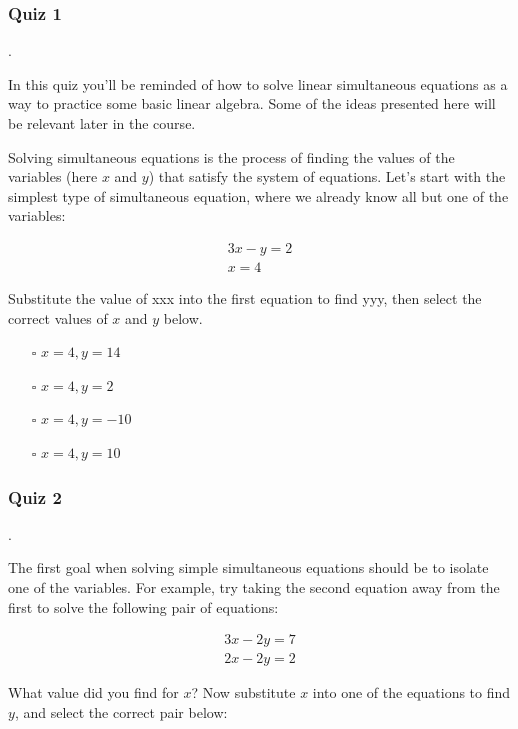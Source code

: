 \documentclass[]{article}
\begin{document}
\subsubsection{Quiz 1}.

In this quiz you'll be reminded of how to solve linear simultaneous equations as a way to practice some basic linear algebra. Some of the ideas presented here will be relevant later in the course.

Solving simultaneous equations is the process of finding the values of the variables (here $ x $ and $ y $) that satisfy the system of equations. Let's start with the simplest type of simultaneous equation, where we already know all but one of the variables:

\begin{equation} \label{}
\begin{split}
	3x - y = 2 \\
	x = 4
\end{split}
\end{equation}

Substitute the value of xxx into the first equation to find yyy, then select the correct values of $ x $ and $ y $ below.

\begin{itemize}
	\item[$\square$] $ x = 4, y = 14 $
	\item[$\square$] $ x = 4, y = 2 $
	\item[$\square$] $ x = 4, y = -10 $
	\item[$\square$] $ x = 4, y = 10 $
\end{itemize}

\subsubsection{Quiz 2}.

The first goal when solving simple simultaneous equations should be to isolate one of the variables. For example, try taking the second equation away from the first to solve the following pair of equations:

\begin{equation} \label{}
\begin{split}
3x - 2y = 7 \\
2x - 2y = 2
\end{split}
\end{equation}

What value did you find for $ x $? Now substitute $ x $ into one of the equations to find $ y $, and select the correct pair below:
\end{document}
